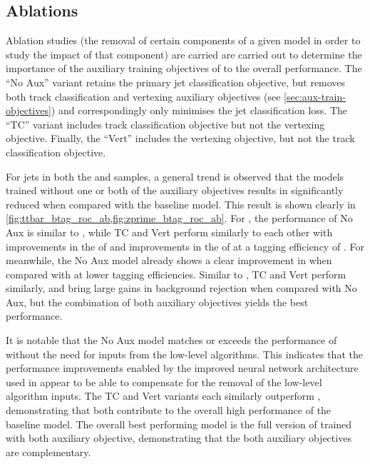  

\subsection{Ablations}\label{sec:gnn_ablations}

Ablation studies (the removal of certain components of a given model in order to study the impact of that component) are carried are carried out to determine the importance of the auxiliary training objectives of \GNN to the overall performance.
The ``\GNN No Aux'' variant retains the primary jet classification objective, but removes both track classification and vertexing auxiliary objectives (see \cref{sec:aux-train-objectives}) and correspondingly only minimises the jet classification loss.
The ``\GNN TC'' variant includes track classification objective but not the vertexing objective.
Finally, the ``\GNN Vert'' includes the vertexing objective, but not the track classification objective.

For jets in both the \ttbar and \Zprime samples, a general trend is observed that the models trained without one or both of the auxiliary objectives results in significantly reduced \clrej when compared with the baseline \GNN model.
This result is shown clearly in \cref{fig:ttbar_btag_roc_ab,fig:zprime_btag_roc_ab}.
For \ttbarjets, the performance of \GNN No Aux is similar to \DLr, while \GNN TC and \GNN Vert perform similarly to each other with improvements in the \crej of  and improvements in the \lrej of  at a \bjet tagging efficiency of .
For \Zprimejets meanwhile, the \GNN No Aux model already shows a clear improvement in \clrej when compared with \DLr at lower \bjet tagging efficiencies.
Similar to \ttbarjets, \GNN TC and \GNN Vert perform similarly, and bring large gains in background rejection when compared with \GNN No Aux, but the combination of both auxiliary objectives yields the best performance.

It is notable that the \GNN No Aux model matches or exceeds the performance of \DLr without the need for inputs from the low-level algorithms.
This indicates that the performance improvements enabled by the improved neural network architecture used in \GNN appear to be able to compensate for the removal of the low-level algorithm inputs.
The \GNN TC and \GNN Vert variants each similarly outperform \DLr, demonstrating that both contribute to the overall high performance of the baseline model.
The overall best performing model is the full version of \GNN trained with both auxiliary objective, demonstrating that the both auxiliary objectives are complementary.



